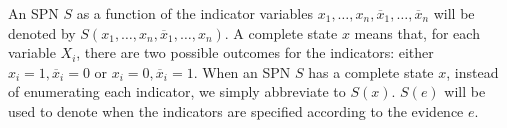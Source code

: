 \documentclass[a4paper,10pt]{article}
\theoremstyle{plain}
\begin{document}
\begin{figure}[h]
  \captionsetup{justification=centering}
\end{figure}

An SPN $S$ as a function of the indicator variables $x_1,\ldots,x_n,\overline{x}_1,\ldots,
\overline{x}_n$ will be denoted by $S(x_1,\ldots,x_n,\overline{x}_1,\ldots,x_n)$. A complete state
$x$ means that, for each variable $X_i$, there are two possible outcomes for the indicators: either
$x_i=1,\overline{x}_i=0$ or $x_i=0,\overline{x}_i=1$. When an SPN $S$ has a complete state $x$,
instead of enumerating each indicator, we simply abbreviate to $S(x)$. $S(e)$ will be used to
denote when the indicators are specified according to the evidence $e$.
\end{document}
